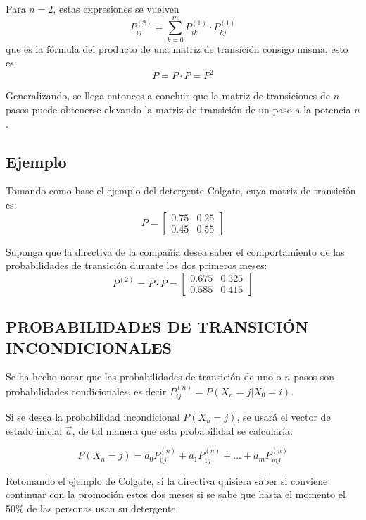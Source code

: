 \documentclass{article}
\begin{document}
Para \( n=2 \), estas expresiones se vuelven
\begin{equation}
    P_{ij}^{(2)} = \sum_{k=0}^{m} P_{ik}^{(1)} \cdot P_{kj}^{(1)}
\end{equation}
que es la fórmula del producto de una matriz de transición consigo misma, esto es:
\begin{equation}
    P = P \cdot P = P^2
\end{equation}

Generalizando, se llega entonces a concluir que la matriz de transiciones de \( n \) pasos puede obtenerse elevando la matriz de transición de un paso a la potencia \( n \).

\subsection*{Ejemplo}

Tomando como base el ejemplo del detergente Colgate, cuya matriz de transición es:
\[
    P = \begin{bmatrix}
        0.75 & 0.25 \\
        0.45 & 0.55
    \end{bmatrix}
\]

Suponga que la directiva de la compañía desea saber el comportamiento de las probabilidades de transición durante los dos primeros meses:
\[
    P^{(2)} = P \cdot P= \begin{bmatrix}
        0.675 & 0.325 \\
        0.585 & 0.415
    \end{bmatrix}
\]

\subsection*{PROBABILIDADES DE TRANSICIÓN INCONDICIONALES}

Se ha hecho notar que las probabilidades de transición de uno o \(n\) pasos son probabilidades condicionales, es decir \(P_{ij}^{(n)} = P(X_{n} = j | X_{0} = i)\).

Si se desea la probabilidad incondicional \(P(X_{n} = j)\), se usará el vector de estado inicial \(\vec{a}\), de tal manera que esta probabilidad se calcularía:

\[
    P(X_{n} = j) = a_{0}P_{0j}^{(n)} + a_{1}P_{1j}^{(n)} + \ldots + a_{m}P_{mj}^{(n)}
\]

Retomando el ejemplo de Colgate, si la directiva quisiera saber si conviene continuar con la promoción estos dos meses si se sabe que hasta el momento el 50\% de las personas usan su detergente
\end{document}
